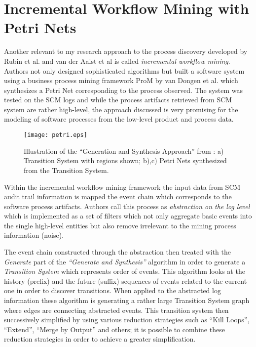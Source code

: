 \section{Incremental Workflow Mining with Petri Nets}
Another relevant to my research approach to the process discovery developed by Rubin et al. \cite{citeulike:1885717} and van der Aalst et al \cite{citeulike:3718014} is called \textit{incremental workflow mining}. Authors not only designed sophisticated algorithms but built a software system using a business process mining framework ProM by van Dongen et al. \cite{citeulike:5043673} which synthesizes a Petri Net corresponding to the process observed. 
The system was tested on the SCM logs and while the process artifacts retrieved from SCM system are rather high-level, the approach discussed is very promising for the modeling of software processes from the low-level product and process data.

\begin{figure}[tbp]
   \centering
   \texttt{[image: petri.eps]}
   \caption{Illustration of the ``Generation and Synthesis Approach'' from \cite{citeulike:5043673}: a) Transition System with regions shown; b),c) Petri Nets synthesized from the Transition System.}
   \label{fig:petri}
\end{figure}

Within the incremental workflow mining framework the input data from SCM audit trail information is mapped the event chain which corresponds to the software process artifacts. Authors call this process as \textit{abstraction on the log level} which is implemented as a set of filters which not only aggregate basic events into the single high-level entities but also remove irrelevant to the mining process information (noise). 

The event chain constructed through the abstraction then treated with the \textit{Generate} part of the \textit{``Generate and Synthesis''} \cite{citeulike:3718014} algorithm in order to generate a \textit{Transition System} which represents order of events. This algorithm looks at the history (prefix) and the future (suffix) sequences of events related to the current one in order to discover transitions.  When applied to the abstracted log information these algorithm is generating a rather large Transition System graph where edges are connecting abstracted events. This transition system then successively simplified by using various reduction strategies such as ``Kill Loops'', ``Extend'', ``Merge by Output'' and others; it is possible to combine these reduction strategies in order to achieve a greater simplification.

